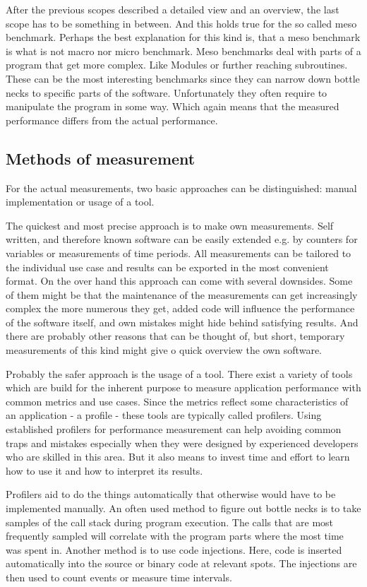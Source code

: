 After the previous scopes described a detailed view and an overview, the last scope has to be something in between. And this holds true for the so called meso benchmark. Perhaps the best explanation for this kind is, that a meso benchmark is what is not macro nor micro benchmark. Meso benchmarks deal with parts of a program that get more complex. Like Modules or further reaching subroutines. These can be the most interesting benchmarks since they can narrow down bottle necks to specific parts of the software. Unfortunately they often require to manipulate the program in some way. Which again means that the measured performance differs from the actual performance.


\subsection{Methods of measurement}
For the actual measurements, two basic approaches can be distinguished: manual implementation or usage of a tool.

The quickest and most precise approach is to make own measurements. Self written, and therefore known software can be easily extended e.g. by counters for variables or measurements of time periods. All measurements can be tailored to the individual use case and results can be exported in the most convenient format. On the over hand this approach can come with several downsides. Some of them might be that the maintenance of the measurements can get increasingly complex the more numerous they get, added code will influence the performance of the software itself, and own mistakes might hide behind satisfying results. And there are probably other reasons that can be thought of, but short, temporary measurements of this kind might give o quick overview the own software.

Probably the safer approach is the usage of a tool. There exist a variety of tools which are build for the inherent purpose to measure application performance with common metrics and use cases. Since the metrics reflect some characteristics of an application - a profile - these tools are typically called profilers. Using established profilers for performance measurement can help avoiding common traps and mistakes especially when they were designed by experienced developers who are skilled in this area. But it also means to invest time and effort to learn how to use it and how to interpret its results.

Profilers aid to do the things automatically that otherwise would have to be implemented manually. An often used method to figure out bottle necks is to take samples of the call stack during program execution. The calls that are most frequently sampled will correlate with the program parts where the most time was spent in. Another method is to use code injections. Here, code is inserted automatically into the source or binary code at relevant spots. The injections are then used to count events or measure time intervals.

